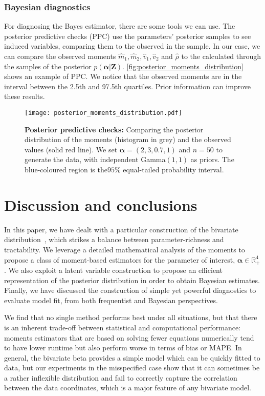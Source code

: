 \documentclass[a4paper, notitlepage, 10pt]{article}
\newcommand{\dd}{\boldsymbol{Z}}
\newcommand{\parameter}{\boldsymbol{\alpha}}
\theoremstyle{definition}
\begin{document}
\subsubsection{Bayesian diagnostics}

For diagnosing the Bayes estimator, there are some tools we can use.
The posterior predictive checks (PPC) use the parameters' posterior samples to see induced variables, comparing them to the observed in the sample.
In our case, we can compare the observed moments $\hat{m}_1, \hat{m}_2, \hat{v}_1, \hat{v}_2$ and $\hat{\rho}$ to the calculated through the samples of the posterior $p(\parameter | \dd)$.
\autoref{fig:posterior_moments_distribution} shows an example of PPC.\@
We notice that the observed moments are in the interval between the 2.5th and 97.5th quartiles.
Prior information can improve these results.

\begin{figure}[!ht]
    \centering
    \texttt{[image: posterior\_moments\_distribution.pdf]}
    \caption{{\bf Posterior predictive checks:} Comparing the posterior distribution of the moments (histogram in grey) and the observed values (solid red line).
    We set $\parameter = (2,3,0.7,1)$ and $n=50$ to generate the data, with independent Gamma$(1,1)$ as priors.
    The blue-coloured region is the$95\%$ equal-tailed probability interval.}\label{fig:posterior_moments_distribution}
\end{figure}

\section{Discussion and conclusions}\label{sec:conclusion}

In this paper, we have dealt with a particular construction of the bivariate distribution~\citep{olkin2015constructions}, which strikes a balance between parameter-richness and tractability.
We leverage a detailed mathematical analysis of the moments to propose a class of moment-based estimators for the parameter of interest, $\parameter \in \mathbb{R}_+^4$.
We also exploit a latent variable construction to propose an efficient representation of the posterior distribution in order to obtain Bayesian estimates.
Finally, we have discussed the construction of simple yet powerful diagnostics to evaluate model fit, from both frequentist and Bayesian perspectives.

We find that no single method performs best under all situations, but that there is an inherent trade-off between statistical and computational performance: moments estimators that are based on solving fewer equations numerically tend to have lower runtime but also perform worse in terms of bias or MAPE.\@
In general, the bivariate beta provides a simple model which can be quickly fitted to data, but our experiments in the misspecified case show that it can sometimes be a rather inflexible distribution and fail to correctly capture the correlation between the data coordinates, which is a major feature of any bivariate model.
\end{document}
